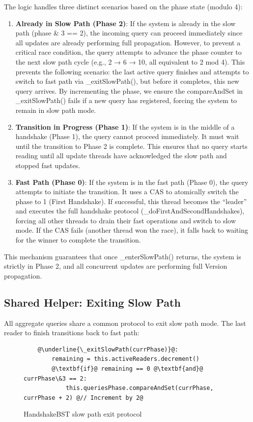 \documentclass[acmsmall,screen,nonacm]{acmart}
\newcommand{\codestyle}[1]{{{\fontsize{9}{10}\ttfamily #1}}}
\begin{document}
The logic handles three distinct scenarios based on the phase state (modulo 4):
\begin{enumerate}
    \item \textbf{Already in Slow Path (Phase 2)}: If the system is already in the slow path (phase \& 3 == 2), the incoming query can proceed immediately since all updates are already performing full propagation. However, to prevent a critical race condition, the query attempts to advance the phase counter to the next slow path cycle (e.g., 2 → 6 → 10, all equivalent to 2 mod 4). This prevents the following scenario: the last active query finishes and attempts to switch to fast path via \codestyle{\_exitSlowPath()}, but before it completes, this new query arrives. By incrementing the phase, we ensure the \codestyle{compareAndSet} in \codestyle{\_exitSlowPath()} fails if a new query has registered, forcing the system to remain in slow path mode.
    \item \textbf{Transition in Progress (Phase 1)}: If the system is in the middle of a handshake (Phase 1), the query cannot proceed immediately. It must wait until the transition to Phase 2 is complete. This ensures that no query starts reading until all update threads have acknowledged the slow path and stopped fast updates.
    \item \textbf{Fast Path (Phase 0)}: If the system is in the fast path (Phase 0), the query attempts to initiate the transition. It uses a CAS to atomically switch the phase to 1 (First Handshake). If successful, this thread becomes the ``leader'' and executes the full handshake protocol (\codestyle{\_doFirstAndSecondHandshakes}), forcing all other threads to drain their fast operations and switch to slow mode. If the CAS fails (another thread won the race), it falls back to waiting for the winner to complete the transition.
\end{enumerate}
This mechanism guarantees that once \codestyle{\_enterSlowPath()} returns, the system is strictly in Phase 2, and all concurrent updates are performing full Version propagation.

\subsection{Shared Helper: Exiting Slow Path}

All aggregate queries share a common protocol to exit slow path mode. The last reader to finish transitions back to fast path:

\begin{figure}[H]
\begin{lstlisting}
    @\underline{\_exitSlowPath(currPhase)}@:
        remaining = this.activeReaders.decrement()
        @\textbf{if}@ remaining == 0 @\textbf{and}@ currPhase\&3 == 2:
            this.queriesPhase.compareAndSet(currPhase, currPhase + 2) @// Increment by 2@
\end{lstlisting}
\caption{HandshakeBST slow path exit protocol}
\label{fig:mybstnext-exitslowpath}
\end{figure}
\end{document}
